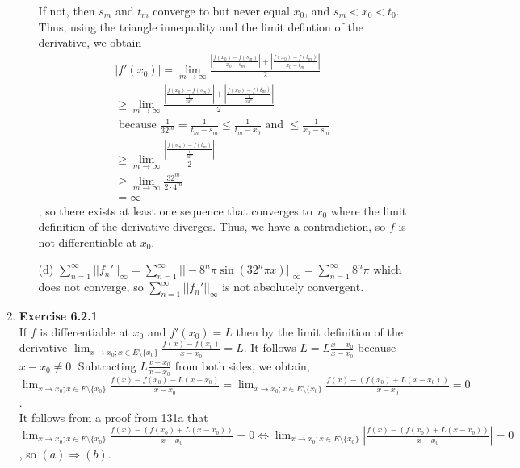 \documentclass[10pt]{article}
\begin{document}
\begin{enumerate}[label=Problem \arabic*.]
\begin{itemize}
        If not, then $s_m$ and $t_m$ converge to but never equal $x_0$, and $s_m<x_0<t_0$. Thus, using the triangle innequality and the limit defintion of the derivative, we obtain
        \begin{align*}
            |f'(x_0)|=\lim_{m\rightarrow\infty}\frac{|\frac{f(x_0)-f(s_m)}{x_0-s_m}|+|\frac{f(x_0)-f(t_m)}{x_0-t_m}|}{2}\\
            \ge\lim_{m\rightarrow\infty}\frac{|\frac{f(x_0)-f(s_m)}{\frac{1}{32^m}}|+|\frac{f(x_0)-f(t_m)}{\frac{1}{32^m}}|}{2}\\ \text{ because }\frac{1}{32^m}=\frac{1}{t_m-s_m}\le\frac{1}{t_m-x_0}\text{ and }\le\frac{1}{x_0-s_m}\\
            \ge\lim_{m\rightarrow\infty}\frac{|\frac{f(s_m)-f(t_m)}{\frac{1}{32^m}}|}{2}\\
            \ge\lim_{m\rightarrow\infty}\frac{32^m}{2\cdot4^m}\\
            =\infty
        \end{align*}
        , so there exists at least one sequence that converges to $x_0$ where the limit definition of the derivative diverges. Thus, we have a contradiction, so $f$ is not differentiable at $x_0$.
        \item[(d)] $\displaystyle\sum_{n=1}^{\infty}||f_n'||_\infty=\sum_{n=1}^{\infty}||-8^n\pi\sin(32^n\pi x)||_\infty=\sum_{n=1}^{\infty}8^n\pi$ which does not converge, so $\displaystyle\sum_{n=1}^{\infty}||f_n'||_\infty$ is not absolutely convergent.
    \end{itemize} 
    \item \textbf{Exercise 6.2.1}\\
    If $f$ is differentiable at $x_0$ and $f'(x_0)=L$ then by the limit definition of the derivative $\displaystyle\lim_{x\rightarrow x_0;x\in E\setminus\{x_0\}}\frac{f(x)-f(x_0)}{x-x_0}=L$.
    It follows $L=L\frac{x-x_0}{x-x_0}$ because $x-x_0\neq0$. 
    Subtracting $L\frac{x-x_0}{x-x_0}$ from both sides, we obtain, \\
    $\displaystyle\lim_{x\rightarrow x_0;x\in E\setminus\{x_0\}}\frac{f(x)-f(x_0)-L(x-x_0)}{x-x_0}=\lim_{x\rightarrow x_0;x\in E\setminus\{x_0\}}\frac{f(x)-(f(x_0)+L(x-x_0))}{x-x_0}=0$.\\
    It follows from a proof from 131a that\\ $\displaystyle\lim_{x\rightarrow x_0;x\in E\setminus\{x_0\}}\frac{f(x)-(f(x_0)+L(x-x_0))}{x-x_0}=0\Leftrightarrow\lim_{x\rightarrow x_0;x\in E\setminus\{x_0\}}|\frac{f(x)-(f(x_0)+L(x-x_0))}{x-x_0}|=0$, so $(a)\Rightarrow(b)$.\\

\end{enumerate}
\end{document}
